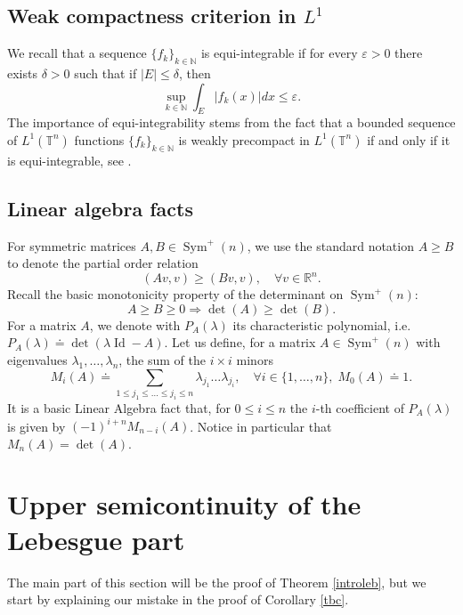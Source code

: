 \documentclass[10pt,reqno]{amsart}
\numberwithin{equation}{section}
\newcommand{\R}{\mathbb{R}}
\newcommand{\T}{\mathbb{T}}
\newcommand{\N}{\mathbb{N}}
\DeclareMathOperator{\Id}{Id}
\DeclareMathOperator{\Sym}{Sym}
\theoremstyle{plain}
\theoremstyle{definition}
\theoremstyle{remark}
\begin{document}
\subsection{Weak compactness criterion in $L^1$} We recall that a sequence $\{f_k\}_{k \in \N}$ is equi-integrable if for every $\varepsilon > 0$ there exists $\delta > 0$ such that if $|E| \le \delta$, then
\[
\sup_{k \in \N}\int_E|f_k(x)|dx \le \varepsilon.
\]
The importance of equi-integrability stems from the fact that a bounded sequence of $L^1(\T^n)$ functions $\{f_k\}_{k \in \N}$ is weakly precompact in $L^1(\T^n)$ if and only if it is equi-integrable, see \cite[Thm. 4.30]{BRE}.

\subsection{Linear algebra facts} For symmetric matrices $A,B \in \Sym^+(n)$, we use the standard notation
$
A \ge B
$
to denote the partial order relation
\[
(Av,v) \ge (Bv,v),\quad  \forall v \in \R^n.
\]
Recall the basic monotonicity property of the determinant on $\Sym^+(n)$:
\[
A \ge B \ge 0 \Rightarrow \det(A) \ge \det(B).
\]
For a matrix $A$, we denote with $P_A(\lambda)$ its characteristic polynomial, i.e. $P_A(\lambda) \doteq \det(\lambda\Id - A)$. Let us define, for a matrix $A \in \Sym^+(n)$ with eigenvalues $\lambda_1,\dots,\lambda_n$, the sum of the $i\times i$ minors
\begin{equation}\label{M}
M_i(A) \doteq \sum_{1\le j_1\le\dots\le j_i \le n}\lambda_{j_1}\dots\lambda_{j_i}, \quad \forall i \in \{1,\dots, n\},\; M_0(A) \doteq 1.
\end{equation}
It is a basic Linear Algebra fact that, for  $0 \le i \le n$ the $i$-th coefficient of $P_A(\lambda)$ is given by $(-1)^{i + n}M_{n - i}(A)$. Notice in particular that $M_n(A) = \det(A)$.


\section{Upper semicontinuity of the Lebesgue part}\label{uscleb}

The main part of this section will be the proof of Theorem \ref{introleb}, but we start by explaining our mistake in the proof of Corollary \ref{tbc}.
\end{document}
